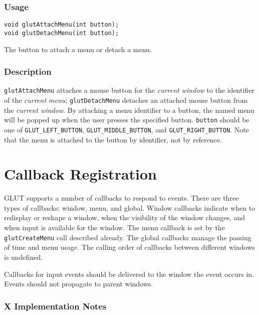 \subsubsection*{Usage}
\begin{verbatim}
void glutAttachMenu(int button);
void glutDetachMenu(int button);
\end{verbatim}
\begin{description}
\itemsep 0in
\item[{\tt button}]
The button to attach a menu or detach a menu.
\end{description}

\subsubsection*{Description}

{\tt glutAttachMenu} attaches a mouse button for the {\em current window} to the identifier of
the {\em current menu}; {\tt glutDetachMenu} detaches an attached mouse button from the
{\em current window}.  By attaching a menu identifier to a button, the named menu
will be popped up when the user presses the specified button.
{\tt button} should be one of {\tt GLUT\_LEFT\_BUTTON}, {\tt GLUT\_MIDDLE\_BUTTON},
and {\tt GLUT\_RIGHT\_BUTTON}.  Note that the menu is attached to the button by
identifier, not by reference.

\section{Callback Registration}

GLUT supports a number of callbacks to respond to events.  There are
three types of callbacks:  window, menu, and global.   Window callbacks
indicate when to redisplay or reshape a window, when the visibility of
the window changes, and when input is available for the window.
The menu callback is set by the {\tt glutCreateMenu} call described already.
The global callbacks manage the passing of time and menu usage.
The calling order of callbacks between different windows is undefined.

Callbacks for input events should be delivered to the window the event
occurs in.  Events should not propagate to parent windows.

\subsubsection*{X Implementation Notes}


